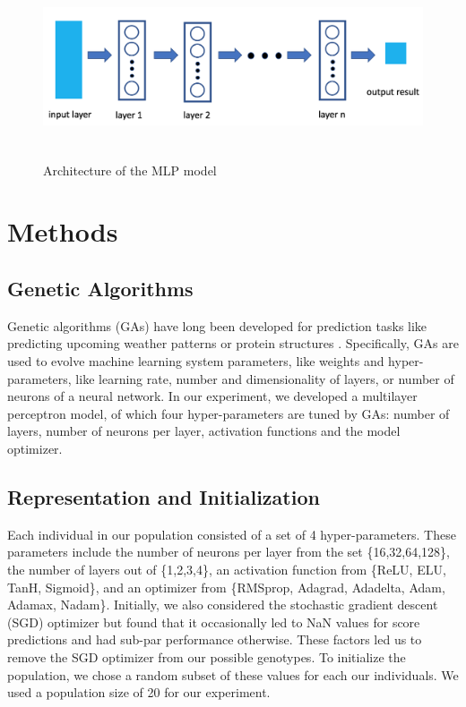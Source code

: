 \documentclass[10pt,twocolumn,letterpaper]{article}
\begin{document}
\begin{figure}[h]
\includegraphics[width=16cm, height=5.4cm]{MLP}
\caption{\label{MLP}Architecture of the MLP model}
\end{figure}
\section{Methods}

\subsection{Genetic Algorithms}
Genetic algorithms (GAs) have long been developed for prediction tasks like predicting upcoming weather patterns or protein structures \cite{mitchell1995genetic}.  Specifically, GAs are used to evolve machine learning system parameters, like weights and hyper-parameters, like learning rate, number and dimensionality of layers, or number of neurons of a neural network.  In our experiment, we developed a multilayer perceptron model, of which four hyper-parameters are tuned by GAs: number of layers, number of neurons per layer, activation functions and the model optimizer.

\subsection{Representation and Initialization}
Each individual in our population consisted of a set of 4 hyper-parameters.  These parameters include the number of neurons per layer from the set \{16,32,64,128\}, the number of layers out of \{1,2,3,4\}, an activation function from \{ReLU, ELU, TanH, Sigmoid\}, and an optimizer from \{RMSprop, Adagrad, Adadelta, Adam, Adamax, Nadam\}. Initially, we also considered the stochastic gradient descent (SGD) optimizer but found that it occasionally led to NaN values for score predictions and had sub-par performance otherwise. These factors led us to remove the SGD optimizer from our possible genotypes. To initialize the population, we chose a random subset of these values for each our individuals.  We used a population size of 20 for our experiment.
\end{document}
